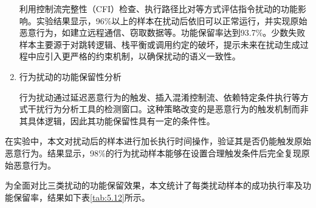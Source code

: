 \begin{enumerate}
利用控制流完整性（CFI）检查、执行路径比对等方式评估指令扰动的功能影响。实验结果显示，96\%以上的样本在扰动后依旧可以正常运行，并实现原始恶意行为，如建立远程通信、窃取数据等。功能保留率达到93.7\%。少数失败样本主要源于对跳转逻辑、栈平衡或调用约定的破坏，提示未来在扰动生成过程中应引入更严格的约束机制，以确保扰动的语义一致性。


\item 行为扰动的功能保留性分析


行为扰动通过延迟恶意行为的触发、插入混淆控制流、依赖特定条件执行等方式干扰行为分析工具的检测窗口。这种策略改变的是恶意行为的触发机制而非其具体逻辑，因此其功能保留性具有一定的条件性。


\end{enumerate}

在实验中，本文对扰动后的样本进行加长执行时间操作，验证其是否仍能触发原始恶意行为。结果显示，98\%的行为扰动样本能够在设置合理触发条件后完全复现原始恶意行为。


为全面对比三类扰动的功能保留效果，本文统计了每类扰动样本的成功执行率及功能保留率，结果如下表\ref{tab:5.12}所示。


